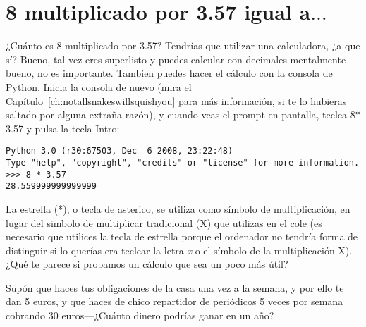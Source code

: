 

\chapter{8 multiplicado por 3.57 igual a$\ldots$}\label{ch:8multipliedby3.57}

¿Cuánto es 8 multiplicado por 3.57? Tendrías que utilizar una calculadora, ¿a que sí? Bueno, tal vez eres superlisto y puedes calcular con decimales mentalmente---bueno, no es importante.  Tambien puedes hacer el cálculo con la consola de Python. Inicia la consola de nuevo (mira el Capítulo~\ref{ch:notallsnakeswillsquishyou} para más información, si te lo hubieras saltado por alguna extraña razón), y cuando veas el prompt en pantalla, teclea 8$*$3.57 y pulsa la tecla Intro:

\begin{listing}
\begin{verbatim}
Python 3.0 (r30:67503, Dec  6 2008, 23:22:48) 
Type "help", "copyright", "credits" or "license" for more information.
>>> 8 * 3.57
28.559999999999999
\end{verbatim}
\end{listing}

La estrella (*), o tecla de asterico, se utiliza como símbolo de multiplicación, en lugar del simbolo de multiplicar tradicional (\textsf{X}) que utilizas en el cole (es necesario que utilices la tecla de estrella porque el ordenador no tendría forma de distinguir si lo querías era teclear la letra \emph{x} o el símbolo de la multiplicación \textsf{X}).  ¿Qué te parece si probamos un cálculo que sea un poco más útil?

Supón que haces tus obligaciones de la casa una vez a la semana, y por ello te dan 5 euros, y que haces de chico repartidor de periódicos 5 veces por semana cobrando 30 euros---¿Cuánto dinero podrías ganar en un año?

